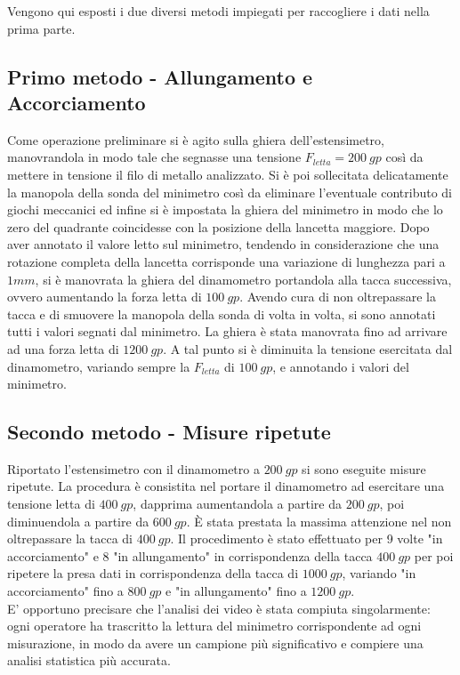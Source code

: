 \documentclass[a4paper,11pt,oneside]{article}
\begin{document}
Vengono qui esposti i due diversi metodi impiegati per raccogliere i dati nella prima parte.

\subsection{Primo metodo - Allungamento e Accorciamento}%
Come operazione preliminare si è agito sulla ghiera dell'estensimetro, manovrandola in modo tale che segnasse una tensione $F_{letta}=\SI{200}{gp}$ così da mettere in tensione il filo di metallo analizzato. Si è poi sollecitata delicatamente la manopola della sonda del minimetro così da eliminare l'eventuale contributo di giochi meccanici ed infine si è impostata la ghiera del minimetro in modo che lo zero del quadrante coincidesse con la posizione della lancetta maggiore. Dopo aver annotato il valore letto sul minimetro, tendendo in considerazione che una rotazione completa della lancetta corrisponde una variazione di lunghezza pari a $\num{1} \si{mm}$, si è manovrata la ghiera del dinamometro portandola alla tacca successiva, ovvero aumentando la forza letta di $\SI{100}{gp}$. Avendo cura di non oltrepassare la tacca e di smuovere la manopola della sonda di volta in volta, si sono annotati tutti i valori segnati dal minimetro. La ghiera è stata manovrata fino ad arrivare ad una forza letta di $\SI{1200}{gp}$. A tal punto si è diminuita la tensione esercitata dal dinamometro, variando sempre la $F_{letta}$ di $\SI{100}{gp}$, e annotando i valori del minimetro.\\

\subsection{Secondo metodo - Misure ripetute}%
Riportato l'estensimetro con il dinamometro a $\SI{200}{gp}$ si sono eseguite misure ripetute. La procedura è consistita nel portare il dinamometro ad esercitare una tensione letta di $\SI{400}{gp}$, dapprima aumentandola a partire da $\SI{200}{gp}$, poi diminuendola a partire da $\SI{600}{gp}$. È stata prestata la massima attenzione nel non oltrepassare la tacca di $\SI{400}{gp}$.
Il procedimento è stato effettuato per 9 volte "in accorciamento" e 8 "in allungamento" in corrispondenza della tacca $\SI{400}{gp}$ per poi ripetere la presa dati in corrispondenza della tacca di $\SI{1000}{gp}$, variando "in accorciamento" fino a $\SI{800}{gp}$ e "in allungamento" fino a $\SI{1200}{gp}$.\\
E' opportuno precisare che l'analisi dei video è stata compiuta singolarmente: ogni operatore ha trascritto la lettura del minimetro corrispondente ad ogni misurazione, in modo da avere un campione più significativo e compiere una analisi statistica più accurata.
\end{document}
